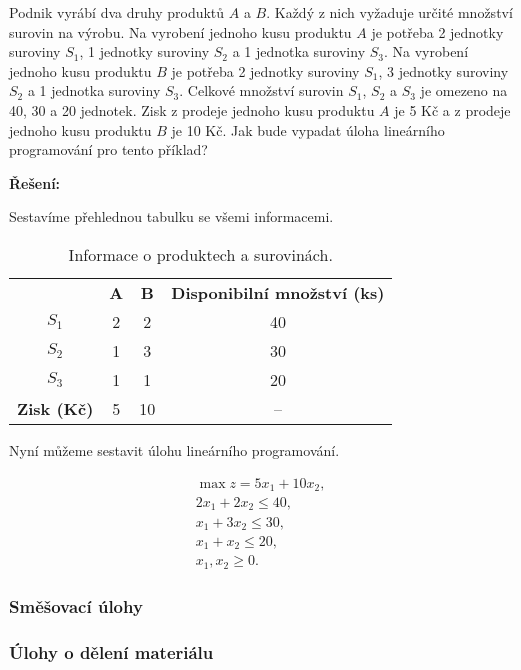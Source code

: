 Podnik vyrábí dva druhy produktů $A$ a $B$. Každý z nich vyžaduje určité množství surovin na výrobu.
Na vyrobení jednoho kusu produktu $A$ je potřeba 2 jednotky suroviny $S_1$, 1 jednotky suroviny $S_2$ a 1 jednotka suroviny $S_3$.
Na vyrobení jednoho kusu produktu $B$ je potřeba 2 jednotky suroviny $S_1$, 3 jednotky suroviny $S_2$ a 1 jednotka suroviny $S_3$.
Celkové množství surovin $S_1$, $S_2$ a $S_3$ je omezeno na 40, 30 a 20 jednotek.
Zisk z prodeje jednoho kusu produktu $A$ je 5 Kč a z prodeje jednoho kusu produktu $B$ je 10 Kč.
Jak bude vypadat úloha lineárního programování pro tento příklad?

\textbf{Řešení:}

Sestavíme přehlednou tabulku se všemi informacemi.

\begin{table}[H]
    \centering
    \begin{tabular}{|c|c|c|c|}
        \hline
        \textbf{} & \textbf{A} & \textbf{B} & \textbf{Disponibilní množství (ks)}\\
        \hhline{|=|=|=|=|}
        $S_1$ & 2 & 2 & 40 \\
        \hline
        $S_2$ & 1 & 3 & 30 \\
        \hline
        $S_3$ & 1 & 1 & 20 \\
        \hhline{|=|=|=|=|}
        \textbf{Zisk (Kč)} & 5 & 10 & -- \\
        \hline
    \end{tabular}
    \caption{Informace o produktech a surovinách.}
    \label{tab:vyroba}
\end{table}

Nyní můžeme sestavit úlohu lineárního programování.

\begin{equation}
    \begin{gathered}
        \max z = 5x_1 + 10x_2, \\
        2x_1 + 2x_2 \leq 40, \\
        x_1 + 3x_2 \leq 30, \\
        x_1 + x_2 \leq 20, \\
        x_1, x_2 \geq 0.
    \end{gathered}
\end{equation}

\subsubsection{Směšovací úlohy}

\subsubsection{Úlohy o dělení materiálu}